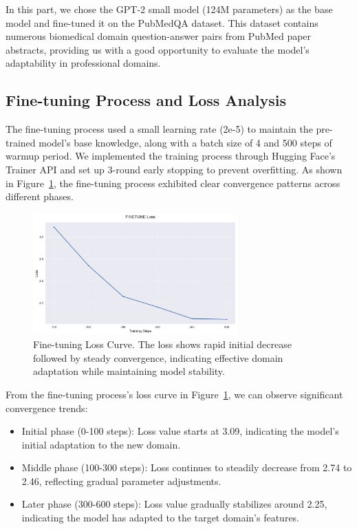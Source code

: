 \documentclass[12pt,oneside]{article}
\begin{document}
In this part, we chose the GPT-2 small model (124M parameters) as the base model and fine-tuned it on the PubMedQA dataset. This dataset contains numerous biomedical domain question-answer pairs from PubMed paper abstracts, providing us with a good opportunity to evaluate the model's adaptability in professional domains.

\subsection{Fine-tuning Process and Loss Analysis}

The fine-tuning process used a small learning rate (2e-5) to maintain the pre-trained model's base knowledge, along with a batch size of 4 and 500 steps of warmup period. We implemented the training process through Hugging Face's Trainer API and set up 3-round early stopping to prevent overfitting. As shown in Figure~\ref{fig:finetune_loss}, the fine-tuning process exhibited clear convergence patterns across different phases.

\begin{figure}[H]
    \centering
    \includegraphics[width=0.7\textwidth]{plots/C/finetune_loss.png}
    \caption{Fine-tuning Loss Curve. The loss shows rapid initial decrease followed by steady convergence, indicating effective domain adaptation while maintaining model stability.}
    \label{fig:finetune_loss}
\end{figure}

From the fine-tuning process's loss curve in Figure~\ref{fig:finetune_loss}, we can observe significant convergence trends:
\begin{itemize}
\item Initial phase (0-100 steps): Loss value starts at 3.09, indicating the model's initial adaptation to the new domain.
\item Middle phase (100-300 steps): Loss continues to steadily decrease from 2.74 to 2.46, reflecting gradual parameter adjustments.
\item Later phase (300-600 steps): Loss value gradually stabilizes around 2.25, indicating the model has adapted to the target domain's features.
\end{itemize}
\end{document}
